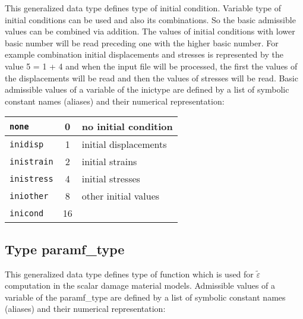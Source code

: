 This generalized data type defines type of initial condition. Variable type of initial conditions can be used
and also its combinations. So the basic admissible values can be combined via addition. The values of initial
conditions with lower basic number will be read preceding one with the higher basic number. For example
combination initial displacements and stresses is represented by the value 5 = 1 + 4 and when the input file will be
processed, the first the values of the displacements will be read and then the values of stresses will be read.
Basic admissible values of a variable of the {\sf inictype} are defined by a list of symbolic constant names (aliases)
and their numerical representation:

\begin{center}
\begin{tabular}{|l|c|l|}
\hline
{\tt none} & 0 & no initial condition
\\ \hline
{\tt inidisp} & 1 & initial displacements
\\ \hline
{\tt inistrain} & 2 & initial strains
\\ \hline
{\tt inistress} & 4 & initial stresses
\\ \hline
{\tt iniother} & 8 & other initial values
\\ \hline
{\tt inicond} & 16 &
\\ \hline
\end{tabular}
\end{center}

\subsection{Type {\sf paramf\_type}}
\label{sectparamftype}

This generalized data type defines type of function which is used for $\tilde\varepsilon$ computation in the scalar
damage material models. Admissible values of a variable of the {\sf paramf\_type} are defined by a list of symbolic
constant names (aliases) and their numerical representation:

